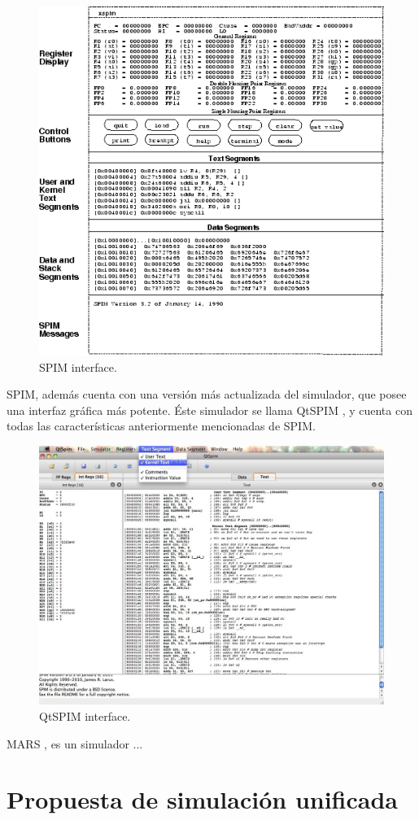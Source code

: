\begin{figure}[htbp]
 	\centering
 	\includegraphics[width=12cm]{figures/spim_figure}
 	\caption{SPIM interface.}
	\label{fig:spim_figure}
\end{figure}

SPIM, además cuenta con una versión más actualizada del simulador, que posee una interfaz gráfica más potente. Éste simulador se llama QtSPIM \cite{aguilar2013simuladores}, y cuenta con todas las características anteriormente mencionadas de SPIM.

\begin{figure}[htbp]
 	\centering
 	\includegraphics[width=12cm]{figures/qtspim_figure}
 	\caption{QtSPIM interface.}
	\label{fig:qtspim_figure}
\end{figure}

MARS \cite{vollmar2006mars}, es un simulador ... 

\section{Propuesta de simulación unificada}
\label{sec:propuesta_simulacion}

